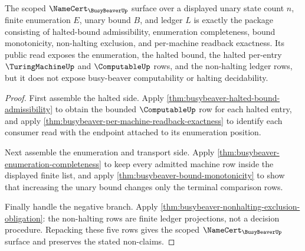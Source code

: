 \begin{theorem}
\label{thm:busybeaver-scoped-namecert-surface}
The scoped $\NameCert_{\BusyBeaverUp}$ surface over a displayed unary state
count $n$, finite enumeration $E$, unary bound $B$, and ledger $L$ is exactly
the package consisting of halted-bound admissibility, enumeration completeness,
bound monotonicity, non-halting exclusion, and per-machine readback exactness.
Its public read exposes the enumeration, the halted bound, the halted
per-entry $\TuringMachineUp$ and $\ComputableUp$ rows, and the non-halting
ledger rows, but it does not expose busy-beaver computability or halting
decidability.
\end{theorem}
\begin{proof}
First assemble the halted side. Apply
\autoref{thm:busybeaver-halted-bound-admissibility} to obtain the bounded
$\ComputableUp$ row for each halted entry, and apply
\autoref{thm:busybeaver-per-machine-readback-exactness} to identify each
consumer read with the endpoint attached to its enumeration position.

Next assemble the enumeration and transport side. Apply
\autoref{thm:busybeaver-enumeration-completeness} to keep every admitted
machine row inside the displayed finite list, and apply
\autoref{thm:busybeaver-bound-monotonicity} to show that increasing the unary
bound changes only the terminal comparison rows.

Finally handle the negative branch. Apply
\autoref{thm:busybeaver-nonhalting-exclusion-obligation}: the non-halting rows
are finite ledger projections, not a decision procedure. Repacking these five
rows gives the scoped $\NameCert_{\BusyBeaverUp}$ surface and preserves the
stated non-claims.
\end{proof}

